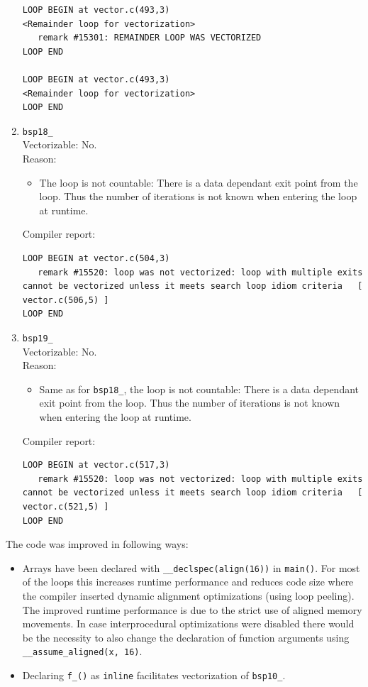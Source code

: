 \documentclass[11pt]{article}
\begin{document}
\begin{enumerate}
\begin{lstlisting}
LOOP BEGIN at vector.c(493,3)
<Remainder loop for vectorization>
   remark #15301: REMAINDER LOOP WAS VECTORIZED
LOOP END

LOOP BEGIN at vector.c(493,3)
<Remainder loop for vectorization>
LOOP END
\end{lstlisting}

\item \texttt{bsp18\_}\\
Vectorizable: No.\\
Reason:
\begin{itemize}
\item The loop is not countable: There is a data dependant exit point from the loop. Thus the number of iterations is not known when entering the loop at runtime.
\end{itemize}
Compiler report:
\begin{lstlisting}
LOOP BEGIN at vector.c(504,3)
   remark #15520: loop was not vectorized: loop with multiple exits cannot be vectorized unless it meets search loop idiom criteria   [ vector.c(506,5) ]
LOOP END
\end{lstlisting}

\item \texttt{bsp19\_}\\
Vectorizable: No.\\
Reason:
\begin{itemize}
\item Same as for \texttt{bsp18\_}, the loop is not countable: There is a data dependant exit point from the loop. Thus the number of iterations is not known when entering the loop at runtime.
\end{itemize}
Compiler report:
\begin{lstlisting}
LOOP BEGIN at vector.c(517,3)
   remark #15520: loop was not vectorized: loop with multiple exits cannot be vectorized unless it meets search loop idiom criteria   [ vector.c(521,5) ]
LOOP END
\end{lstlisting}
\end{enumerate}

The code was improved in following ways:
\begin{itemize}
\item Arrays have been declared with \texttt{\_\_declspec(align(16))} in \texttt{main()}. For most of the loops this increases runtime performance and reduces code size where the compiler inserted dynamic alignment optimizations (using loop peeling). The improved runtime performance is due to the strict use of aligned memory movements. In case interprocedural optimizations were disabled there would be the necessity to also change the declaration of function arguments using \texttt{\_\_assume\_aligned(x, 16)}.
\item Declaring \texttt{f\_()} as \texttt{inline} facilitates vectorization of \texttt{bsp10\_}.
\end{itemize}
\end{document}
